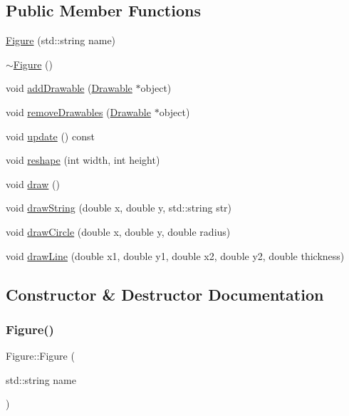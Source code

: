 \subsection*{Public Member Functions}
\begin{DoxyCompactItemize}
\item 
\hyperlink{classFigure_a9c58a51110b7035bb899035b15f6aa6d}{Figure} (std\+::string name)
\item 
\hyperlink{classFigure_af155c20558330034441de6a19d94f4a7}{$\sim$\+Figure} ()
\item 
void \hyperlink{classFigure_ac4960ce394966b1171c8ea49fb694cef}{add\+Drawable} (\hyperlink{classDrawable}{Drawable} $\ast$object)
\item 
void \hyperlink{classFigure_a6f239679543a9154ca1b6523094f7eae}{remove\+Drawables} (\hyperlink{classDrawable}{Drawable} $\ast$object)
\item 
void \hyperlink{classFigure_ac78a5c4997e27f48b40a2d86a4b92b9c}{update} () const
\item 
void \hyperlink{classFigure_a876db9bf0c44bcdcdac91f7d040d5f71}{reshape} (int width, int height)
\item 
void \hyperlink{classFigure_afb62fad838fc6f7ece4f88b318b5862a}{draw} ()
\item 
void \hyperlink{classFigure_a8d06d9d1a75b58c6f40881c0737bc5e2}{draw\+String} (double x, double y, std\+::string str)
\item 
void \hyperlink{classFigure_a7c99f033d2de6e1148bfd972610ad61b}{draw\+Circle} (double x, double y, double radius)
\item 
void \hyperlink{classFigure_ad5edf6262504de7c3c7eff6eb8be3c3e}{draw\+Line} (double x1, double y1, double x2, double y2, double thickness)
\end{DoxyCompactItemize}


\subsection{Constructor \& Destructor Documentation}
\mbox{\label{classFigure_a9c58a51110b7035bb899035b15f6aa6d}} 
\subsubsection{\texorpdfstring{Figure()}{Figure()}}
{\footnotesize\ttfamily Figure\+::\+Figure (\begin{DoxyParamCaption}\item[{std\+::string}]{name }\end{DoxyParamCaption})}


